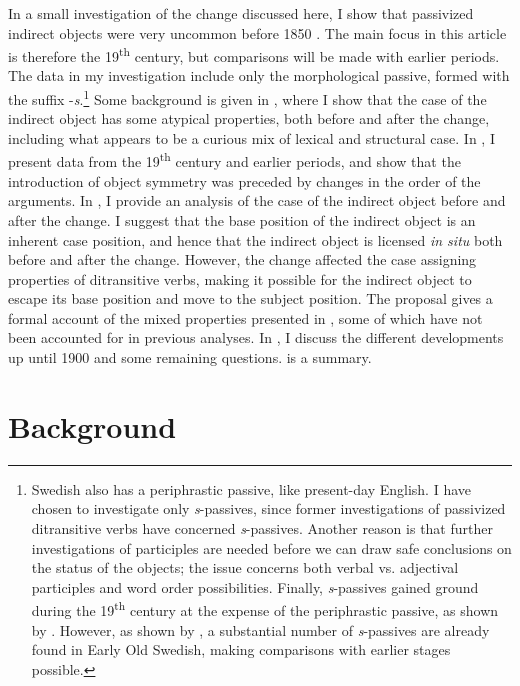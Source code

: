 \documentclass[output=paper]{langscibook}
\begin{document}
In a small investigation of the change discussed here, I show that passivized indirect objects were very uncommon before 1850 \citep[167]{Falk1997}. The main focus in this article is therefore the 19\textsuperscript{th} century, but comparisons will be made with earlier periods. The data in my investigation include only the morphological passive, formed with the suffix -\textit{s}.\footnote{Swedish also has a periphrastic passive, like present-day English. I have chosen to investigate only \textit{s}{}-passives, since former investigations of passivized ditransitive verbs have concerned \textit{s}{}-passives. Another reason is that further investigations of participles are needed before we can draw safe conclusions on the status of the objects; the issue concerns both verbal vs. adjectival participles and word order possibilities. Finally, \textit{s}{}-passives gained ground during the 19\textsuperscript{th} century at the expense of the periphrastic passive, as shown by \citet{Kirri1975}. However, as shown by \citet{Holm1952}, a substantial number of \textit{s}{}-passives are already found in Early Old Swedish, making comparisons with earlier stages possible.} Some background is given in , where I show that the case of the indirect object has some atypical properties, both before and after the change, including what appears to be a curious mix of lexical and structural case. In , I present data from the 19\textsuperscript{th} century and earlier periods, and show that the introduction of object symmetry was preceded by changes in the order of the arguments. In , I provide an analysis of the case of the indirect object before and after the change. I suggest that the base position of the indirect object is an inherent case position, and hence that the indirect object is licensed \textit{in situ} both before and after the change. However, the change affected the case assigning properties of ditransitive verbs, making it possible for the indirect object to escape its base position and move to the subject position. The proposal gives a formal account of the mixed properties presented in , some of which have not been accounted for in previous analyses. In , I discuss the different developments up until 1900 and some remaining questions.  is a summary.

\section{Background}\label{sec:falk:2}
\end{document}

